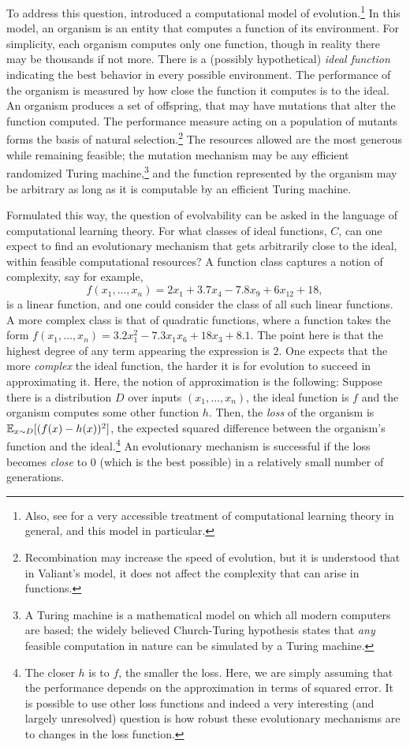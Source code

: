 \documentclass{acmtr2e}
\begin{document}
To address this question,  introduced a
computational model of evolution.\footnote{Also, see
 for a very accessible treatment of computational
learning theory in general, and this model in particular.} In this model, an
organism is an entity that computes a function of its environment. For
simplicity, each organism computes only one function, though in reality there
may be thousands if not more. There is a (possibly hypothetical) \emph{ideal
function} indicating the best behavior in every possible environment. The
performance of the organism is measured by how close the function it computes is
to the ideal. An organism produces a set of offspring, that may have mutations
that  alter the function computed. The performance measure acting on a
population of mutants forms the basis of natural
selection.\footnote{Recombination may increase the speed of evolution, but it is
understood that in Valiant's model, it does not affect the complexity that can
arise in functions.} The resources allowed are the most generous while remaining
feasible; the mutation mechanism may be any efficient randomized Turing
machine,\footnote{A Turing machine is a mathematical model on which all modern
computers are based; the widely believed Church-Turing hypothesis states that
\emph{any} feasible computation in nature can be simulated by a Turing machine.}
and the function represented by the organism may be arbitrary as long as it is
computable by an efficient Turing machine.

Formulated this way, the question of evolvability can be asked in the language
of computational learning theory. For what classes of ideal functions, $C$, can
one expect to find an evolutionary mechanism that gets arbitrarily close to the
ideal, within feasible computational resources? A function class captures a
notion of complexity, say for example,
\[ f(x_1, \ldots, x_n) = 2 x_1 + 3.7 x_4 - 7.8 x_9 + 6 x_{12} + 18, \]
is a linear function, and one could consider the class of all such linear
functions. A more complex class is that of quadratic functions, where a function
takes the form $f(x_1, \ldots, x_n) = 3.2 x_1^2 - 7.3 x_1 x_6 + 18 x_3 + 8.1$.
The point here is that the highest degree of any term appearing the expression
is $2$. One expects that the more \emph{complex} the ideal function, the harder
it is for evolution to succeed in approximating it. Here, the notion of
approximation is the following: Suppose there is a distribution $D$ over inputs
$(x_1, \ldots, x_n)$, the ideal function is $f$ and the organism computes some
other function $h$. Then, the \emph{loss} of the organism is $\mathbb{E}_{x \sim
D}[(f(x) - h(x))^2]$, the expected squared difference between the
organism's function and the ideal.\footnote{The closer $h$ is to $f$,
the smaller the loss. Here, we are simply assuming that the
performance depends on the approximation in terms of squared error. It is possible
to use other loss functions and indeed a very interesting (and largely
unresolved) question is how robust these evolutionary mechanisms are to changes
in the loss function.} An evolutionary mechanism is successful if the loss
becomes \emph{close} to $0$ (which is the best possible) in a relatively small
number of generations.
\end{document}
